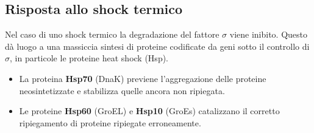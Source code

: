 \subsection{Risposta allo shock termico}
Nel caso di uno shock termico la degradazione del fattore $\sigma$ viene inibito. Questo dà luogo a una massiccia sintesi di proteine codificate da geni sotto il controllo di $\sigma$, in particole le proteine heat shock (Hsp).
\begin{itemize}
    \item La proteina \textbf{Hsp70} (DnaK) previene l'aggregazione delle proteine neosintetizzate e stabilizza quelle ancora non ripiegata.
    \item Le proteine \textbf{Hsp60} (GroEL) e \textbf{Hsp10} (GroEs) catalizzano il corretto ripiegamento di proteine ripiegate erroneamente. 
\end{itemize}
